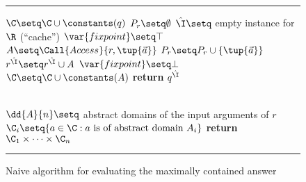 \begin{figure}\label{fig:algo-naive}
\rule{\textwidth}{0.075mm}
\begin{algorithmic}
    \Let $\C \setq \C \cup \constants(q)$
        \Let $P_r \setq \emptyset$
    \EndFor
    \Let $\hat \I \setq$ empty instance for $\R$ (``cache'')
    \Repeat
        \Let $\var{fixpoint} \setq \top$
            \Let $A \setq \Call{Access}{r, \tup{\vec a}}$
            \Let $P_r \setq P_r \cup \{ \tup{\vec a} \}$
            \Let $r^{\hat \I} \setq r^{\hat \I} \cup A$
                \Let $\var{fixpoint} \setq \bot$
                \Let $\C \setq \C \cup \constants(A)$
            \EndIf
        \EndFor
    \State \textbf{return} $q^{\hat \I}$
\EndFunction

\\

    \Let $\dd{A}{n} \setq $ abstract domains of the input arguments of $r$
        \Let $\C_i \setq \{ a \in \C : a \textrm{ is of abstract domain } A_i \}$
    \EndFor
    \State \textbf{return} $\C_1 \times \cdots \times \C_n$
\EndFunction

\end{algorithmic}
\rule{\textwidth}{0.075mm}
\caption{Naive algorithm for evaluating the maximally contained answer}
\end{figure}


